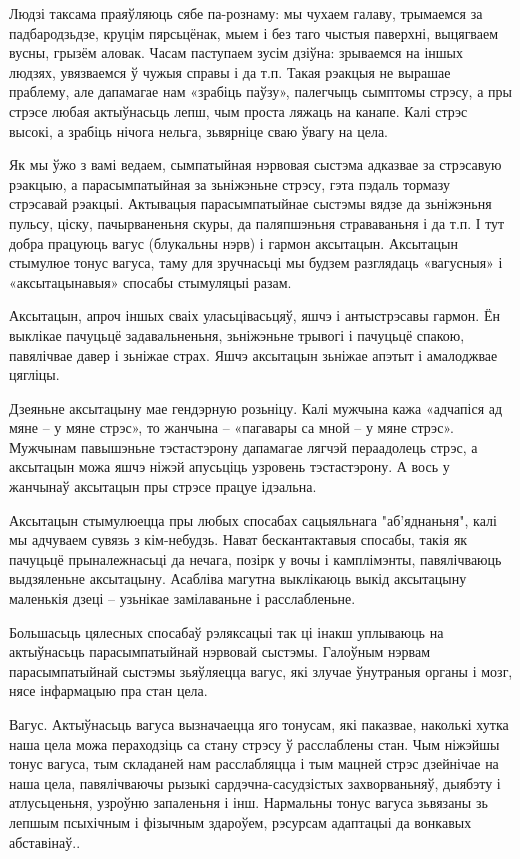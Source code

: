 Людзі таксама праяўляюць сябе па-рознаму: мы чухаем галаву, трымаемся за падбародзьдзе, круцім пярсьцёнак, мыем і без таго чыстыя паверхні, выцягваем вусны, грызём аловак. Часам паступаем зусім дзіўна: зрываемся на іншых людзях, увязваемся ў чужыя справы і да т.п. Такая рэакцыя не вырашае праблему, але дапамагае нам «зрабіць паўзу», палегчыць сымптомы стрэсу, а пры стрэсе любая актыўнасьць лепш, чым проста ляжаць на канапе. Калі стрэс высокі, а зрабіць нічога нельга, зьвярніце сваю ўвагу на цела.

Як мы ўжо з вамі ведаем, сымпатыйная нэрвовая сыстэма адказвае за стрэсавую рэакцыю, а парасымпатыйная за зьніжэньне стрэсу, гэта пэдаль тормазу стрэсавай рэакцыі. Актывацыя парасымпатыйнае сыстэмы вядзе да зьніжэньня пульсу, ціску, пачырваненьня скуры, да паляпшэньня страваваньня і да т.п. І тут добра працуюць вагус (блукальны нэрв) і гармон аксытацын. Аксытацын стымулюе тонус вагуса, таму для зручнасьці мы будзем разглядаць «вагусныя» і «аксытацынавыя» спосабы стымуляцыі разам.

Аксытацын, апроч іншых сваіх уласьцівасьцяў, яшчэ і антыстрэсавы гармон. Ён выклікае пачуцьцё задавальненьня, зьніжэньне трывогі і пачуцьцё спакою, павялічвае давер і зьніжае страх. Яшчэ аксытацын зьніжае апэтыт і амалоджвае цягліцы. 

Дзеяньне аксытацыну мае гендэрную розьніцу. Калі мужчына кажа «адчапіся ад мяне – у мяне стрэс», то жанчына – «пагавары са мной – у мяне стрэс». Мужчынам павышэньне тэстастэрону дапамагае лягчэй пераадолець стрэс, а аксытацын можа яшчэ ніжэй апусьціць узровень тэстастэрону. А вось у жанчынаў аксытацын пры стрэсе працуе ідэальна.

Аксытацын стымулюецца пры любых спосабах сацыяльнага "аб'яднаньня", калі мы адчуваем сувязь з кім-небудзь. Нават бескантактавыя спосабы, такія як пачуцьцё прыналежнасьці да нечага, позірк у вочы і камплімэнты, павялічваюць выдзяленьне аксытацыну. Асабліва магутна выклікаюць выкід аксытацыну маленькія дзеці – узьнікае замілаваньне і расслабленьне. 

Большасьць цялесных спосабаў рэляксацыі так ці інакш уплываюць на актыўнасьць парасымпатыйнай нэрвовай сыстэмы. Галоўным нэрвам парасымпатыйнай сыстэмы зьяўляецца вагус, які злучае ўнутраныя органы і мозг, нясе інфармацыю пра стан цела. 

Вагус. Актыўнасьць вагуса вызначаецца яго тонусам, які паказвае, наколькі хутка наша цела можа пераходзіць са стану стрэсу ў расслаблены стан. Чым ніжэйшы тонус вагуса, тым складаней нам расслабляцца і тым мацней стрэс дзейнічае на наша цела, павялічваючы рызыкі сардэчна-сасудзістых захворваньняў, дыябэту і атлусьценьня, узроўню запаленьня і інш. Нармальны тонус вагуса зьвязаны зь лепшым псыхічным і фізычным здароўем, рэсурсам адаптацыі да вонкавых абставінаў..

